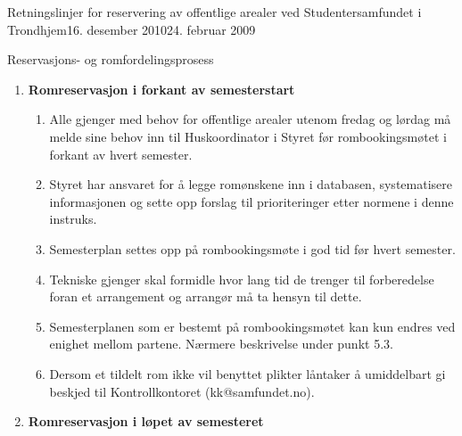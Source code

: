 \begin{instruks}{Retningslinjer for reservering av offentlige arealer
    ved Studentersamfundet i Trondhjem}{16. desember 2010}{24. februar 2009}
\begin{instruksledd}{Reservasjons- og romfordelingsprosess}
        \begin{enumerate}
            \item \textbf{Romreservasjon i forkant av semesterstart}
                \begin{enumerate}
                    \item Alle gjenger med behov for offentlige arealer utenom fredag
                        og lørdag må melde sine behov inn til
                        Huskoordinator i Styret før rombookingsmøtet i forkant av hvert
                        semester.
                    \item Styret har ansvaret for å legge romønskene inn i databasen,
                        systematisere informasjonen og sette opp forslag til
                        prioriteringer etter normene i denne instruks.
                    \item Semesterplan settes opp på rombookingsmøte i god tid før
                        hvert semester.
                    \item Tekniske gjenger skal formidle hvor lang tid de trenger til
                        forberedelse foran et arrangement og arrangør må
                        ta hensyn til dette.
                    \item Semesterplanen som er bestemt på rombookingsmøtet kan kun
                        endres ved enighet mellom partene. Nærmere
                        beskrivelse under punkt 5.3.
                    \item Dersom et tildelt rom ikke vil benyttet plikter låntaker å
                        umiddelbart gi beskjed til Kontrollkontoret
                        (kk@samfundet.no).
                \end{enumerate}

            \item \textbf{Romreservasjon i løpet av semesteret}


\end{enumerate}
\end{instruksledd}
\end{instruks}
